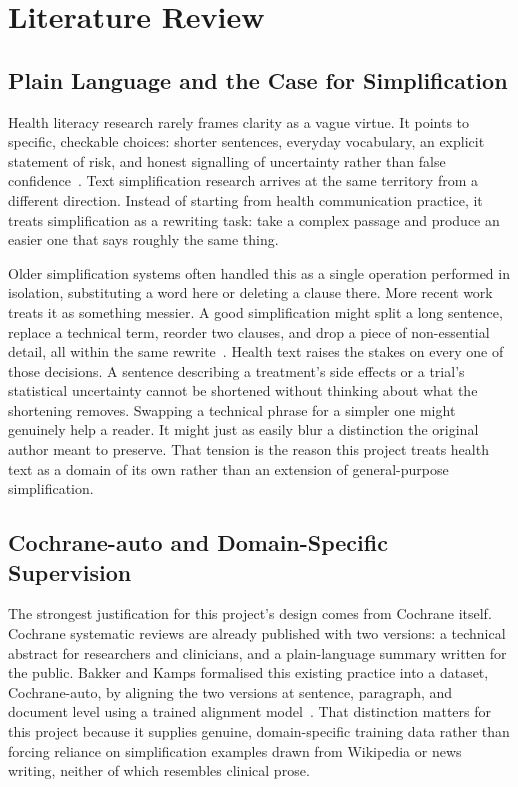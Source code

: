 \chapter{Literature Review}
\label{ch:literature-review}

\section{Plain Language and the Case for Simplification}
\label{sec:plain-language}

Health literacy research rarely frames clarity as a vague virtue. It points to specific, checkable choices: shorter sentences, everyday vocabulary, an explicit statement of risk, and honest signalling of uncertainty rather than false confidence~\cite{hra2025plainlanguage,mrct2025plainlanguage}. Text simplification research arrives at the same territory from a different direction. Instead of starting from health communication practice, it treats simplification as a rewriting task: take a complex passage and produce an easier one that says roughly the same thing.

Older simplification systems often handled this as a single operation performed in isolation, substituting a word here or deleting a clause there. More recent work treats it as something messier. A good simplification might split a long sentence, replace a technical term, reorder two clauses, and drop a piece of non-essential detail, all within the same rewrite~\cite{alvamanchego2020asset}. Health text raises the stakes on every one of those decisions. A sentence describing a treatment's side effects or a trial's statistical uncertainty cannot be shortened without thinking about what the shortening removes. Swapping a technical phrase for a simpler one might genuinely help a reader. It might just as easily blur a distinction the original author meant to preserve. That tension is the reason this project treats health text as a domain of its own rather than an extension of general-purpose simplification.

\section{Cochrane-auto and Domain-Specific Supervision}
\label{sec:cochrane-auto-lit}

The strongest justification for this project's design comes from Cochrane itself. Cochrane systematic reviews are already published with two versions: a technical abstract for researchers and clinicians, and a plain-language summary written for the public. Bakker and Kamps formalised this existing practice into a dataset, Cochrane-auto, by aligning the two versions at sentence, paragraph, and document level using a trained alignment model~\cite{bakker2024cochraneauto}. That distinction matters for this project because it supplies genuine, domain-specific training data rather than forcing reliance on simplification examples drawn from Wikipedia or news writing, neither of which resembles clinical prose.


